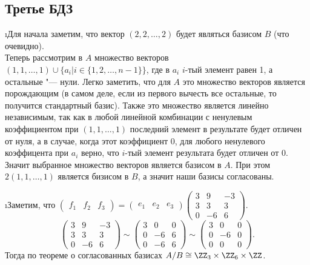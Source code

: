 \subsection{Третье БДЗ}

\i Для начала заметим, что вектор $(2, 2, \ldots, 2)$ будет являться базисом $B$ (что очевидно).\\
Теперь рассмотрим в $A$ множество векторов $(1, 1, \ldots, 1) \cup \{a_i| i \in \{1, 2, \ldots, n-1\}\}$, где в $a_i$ $i$-тый элемент равен 1, а остальные "--- нули. Легко заметить, что для $A$ это множество векторов является порождающим (в самом деле, если из первого вычесть все остальные, то получится стандартный базис). Также это множество является линейно независимым, так как в любой линейной комбинации с ненулевым коэффициентом при $(1, 1, \ldots, 1)$ последний элемент в результате будет отличен от нуля, а в случае, когда этот коэффициент 0, для любого ненулевого коэффицента при $a_i$ верно, что $i$-тый элемент результата будет отличен от 0. Значит выбранное множество векторов является базисом в $A$. При этом $2(1, 1, \ldots, 1)$ является бизисом в $B$, а значит наши базисы согласованы.

\i Заметим, что $\begin{pmatrix}
    f_1 & f_2 & f_3
\end{pmatrix} = \begin{pmatrix}
    e_1 & e_2 & e_3
\end{pmatrix}\begin{pmatrix}
    3 & 9 & -3\\
    3 & 3 & 3\\
    0 & -6 & 6
\end{pmatrix}.$
$$\begin{pmatrix}
    3 & 9 & -3\\
    3 & 3 & 3\\
    0 & -6 & 6
\end{pmatrix} \sim \begin{pmatrix}
    3 & 0 & 0\\
    0 & -6 & 6\\
    0 & -6 & 6
\end{pmatrix} \sim \begin{pmatrix}
    3 & 0 & 0\\
    0 & -6 & 0\\
    0 & 0 & 0
\end{pmatrix}.$$
Тогда по теореме о согласованных базисах $A/B \cong \ZZ_3 \times \ZZ_6 \times \ZZ$.

